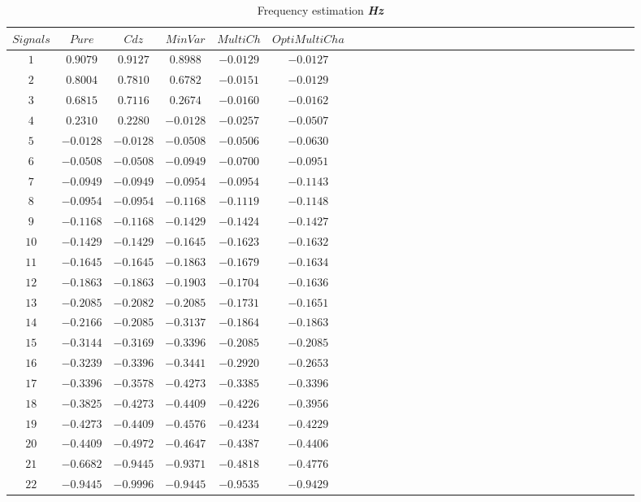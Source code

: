  \begin{table}[!htbp]
\centering
\caption{Frequency estimation \textbf{\textit{Hz}}}
\label{table:5}
\begin{tabular}{c c c c c c c c c c c c c c c c c c c c c c c c c c c c c c c } 
   \hline 
$Signals$&$Pure$&$Cdz$&$MinVar$&$MultiCh$&$OptiMultiCha$\\
   \hline 

$1$&$ 0.9079$&$ 0.9127$&$ 0.8988$&$-0.0129$&$-0.0127$\\
$2$&$ 0.8004$&$ 0.7810$&$ 0.6782$&$-0.0151$&$-0.0129$\\
$3$&$ 0.6815$&$ 0.7116$&$ 0.2674$&$-0.0160$&$-0.0162$\\
$4$&$ 0.2310$&$ 0.2280$&$-0.0128$&$-0.0257$&$-0.0507$\\
$5$&$-0.0128$&$-0.0128$&$-0.0508$&$-0.0506$&$-0.0630$\\
$6$&$-0.0508$&$-0.0508$&$-0.0949$&$-0.0700$&$-0.0951$\\
$7$&$-0.0949$&$-0.0949$&$-0.0954$&$-0.0954$&$-0.1143$\\
$8$&$-0.0954$&$-0.0954$&$-0.1168$&$-0.1119$&$-0.1148$\\
$9$&$-0.1168$&$-0.1168$&$-0.1429$&$-0.1424$&$-0.1427$\\
$10$&$-0.1429$&$-0.1429$&$-0.1645$&$-0.1623$&$-0.1632$\\
$11$&$-0.1645$&$-0.1645$&$-0.1863$&$-0.1679$&$-0.1634$\\
$12$&$-0.1863$&$-0.1863$&$-0.1903$&$-0.1704$&$-0.1636$\\
$13$&$-0.2085$&$-0.2082$&$-0.2085$&$-0.1731$&$-0.1651$\\
$14$&$-0.2166$&$-0.2085$&$-0.3137$&$-0.1864$&$-0.1863$\\
$15$&$-0.3144$&$-0.3169$&$-0.3396$&$-0.2085$&$-0.2085$\\
$16$&$-0.3239$&$-0.3396$&$-0.3441$&$-0.2920$&$-0.2653$\\
$17$&$-0.3396$&$-0.3578$&$-0.4273$&$-0.3385$&$-0.3396$\\
$18$&$-0.3825$&$-0.4273$&$-0.4409$&$-0.4226$&$-0.3956$\\
$19$&$-0.4273$&$-0.4409$&$-0.4576$&$-0.4234$&$-0.4229$\\
$20$&$-0.4409$&$-0.4972$&$-0.4647$&$-0.4387$&$-0.4406$\\
$21$&$-0.6682$&$-0.9445$&$-0.9371$&$-0.4818$&$-0.4776$\\
$22$&$-0.9445$&$-0.9996$&$-0.9445$&$-0.9535$&$-0.9429$\\
     \hline 

\end{tabular}
\end{table}

